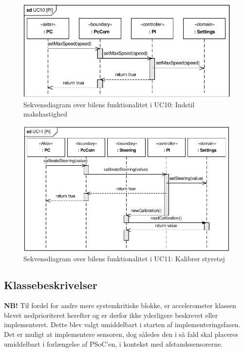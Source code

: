 \begin{figure}[h]
\centering
\includegraphics[]{../fig/diagrammer/bil/sd_uc10.pdf}
\caption{Sekvensdiagram over  bilens funktionalitet i UC10: Indstil makshastighed}
\label{fig:sd_uc10_bil}
\end{figure}

\begin{figure}[h]
\centering
\includegraphics[]{../fig/diagrammer/bil/sd_uc11.pdf}
\caption{Sekvensdiagram over  bilens funktionalitet i UC11: Kalibrer styretøj}
\label{fig:sd_uc11_bil}
\end{figure}

\clearpage
\subsection{Klassebeskrivelser}
\clearpage

\clearpage

\clearpage

\clearpage

\clearpage

\clearpage

\clearpage


\textbf{NB!}
Til fordel for andre mere systemkritiske blokke, er accelerometer klassen blevet nedprioriteret herefter og er derfor ikke yderligere beskrevet eller implementeret. Dette blev valgt umiddelbart i starten af implementeringsfasen. Det er muligt at implementere sensoren, dog således den i så fald skal placeres umiddelbart i forlængelse af PSoC'en, i kontekst med afstandssensorerne.